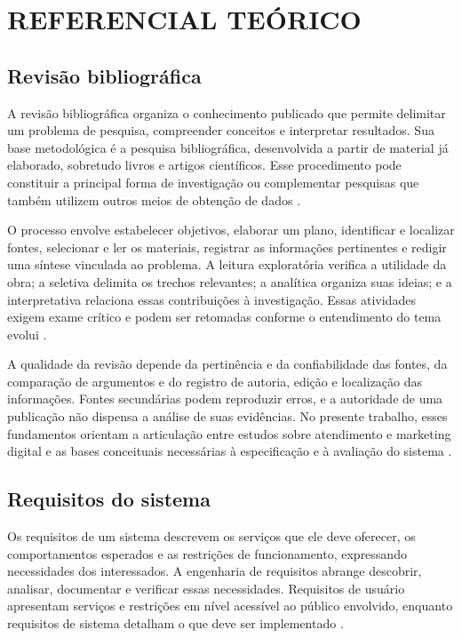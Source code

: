 \section{\esp REFERENCIAL TEÓRICO}

\subsection{\esp Revisão bibliográfica}

A revisão bibliográfica organiza o conhecimento publicado que permite delimitar um problema de pesquisa, compreender conceitos e interpretar resultados. Sua base metodológica é a pesquisa bibliográfica, desenvolvida a partir de material já elaborado, sobretudo livros e artigos científicos. Esse procedimento pode constituir a principal forma de investigação ou complementar pesquisas que também utilizem outros meios de obtenção de dados \cite{GIL_1991}.

O processo envolve estabelecer objetivos, elaborar um plano, identificar e localizar fontes, selecionar e ler os materiais, registrar as informações pertinentes e redigir uma síntese vinculada ao problema. A leitura exploratória verifica a utilidade da obra; a seletiva delimita os trechos relevantes; a analítica organiza suas ideias; e a interpretativa relaciona essas contribuições à investigação. Essas atividades exigem exame crítico e podem ser retomadas conforme o entendimento do tema evolui \cite{GIL_1991}.

A qualidade da revisão depende da pertinência e da confiabilidade das fontes, da comparação de argumentos e do registro de autoria, edição e localização das informações. Fontes secundárias podem reproduzir erros, e a autoridade de uma publicação não dispensa a análise de suas evidências. No presente trabalho, esses fundamentos orientam a articulação entre estudos sobre atendimento e marketing digital e as bases conceituais necessárias à especificação e à avaliação do sistema \cite{GIL_1991,BOOTH_COLOMB_WILLIAMS_2008}.

\subsection{\esp Requisitos do sistema}

Os requisitos de um sistema descrevem os serviços que ele deve oferecer, os comportamentos esperados e as restrições de funcionamento, expressando necessidades dos interessados. A engenharia de requisitos abrange descobrir, analisar, documentar e verificar essas necessidades. Requisitos de usuário apresentam serviços e restrições em nível acessível ao público envolvido, enquanto requisitos de sistema detalham o que deve ser implementado \cite{SOMMERVILLE_2011}.

